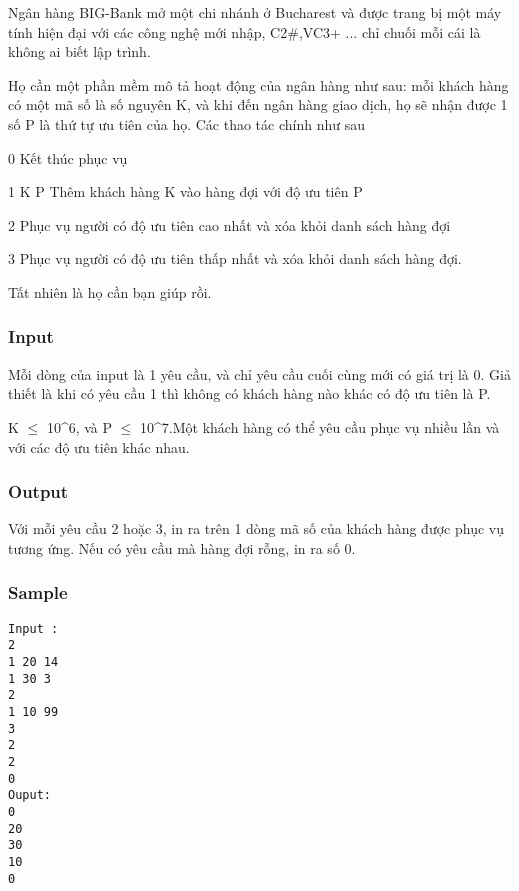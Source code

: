 



   Ngân hàng  BIG-Bank mở một chi nhánh ở Bucharest và được trang bị một máy tính hiện đại với các công nghệ mới nhập, C2\#,VC3+ ... chỉ chuối mỗi cái là không ai biết lập trình.  

   Họ cần một phần mềm mô tả hoạt động của ngân hàng như sau: mỗi khách hàng có một mã số là số nguyên K, và khi đến ngân hàng giao dịch, họ sẽ nhận được 1 số P là thứ tự ưu tiên của họ. Các thao tác chính như sau  

   0  Kết thúc phục vụ  

   1  K P Thêm khách hàng K vào hàng đợi với độ ưu tiên P  

   2  Phục vụ người có độ ưu tiên cao nhất và xóa khỏi danh sách hàng đợi  

   3  Phục vụ người có độ ưu tiên thấp nhất và xóa khỏi danh sách hàng đợi.  

   Tất nhiên là họ cần bạn giúp rồi.  



\subsubsection{   Input  }



   Mỗi dòng của input là 1 yêu cầu, và chỉ yêu cầu cuối cùng mới có giá trị là 0. Giả thiết là khi có yêu cầu 1 thì không có khách hàng nào khác có độ ưu tiên là P.  

   K $\le$ 10^6, và P $\le$  10^7.Một khách hàng có thể yêu cầu phục vụ nhiều lần và với các độ ưu tiên khác nhau.  



\subsubsection{   Output  }



   Với mỗi yêu cầu 2 hoặc 3, in ra trên 1 dòng mã số của khách hàng được phục vụ tương ứng. Nếu có yêu cầu mà hàng đợi rỗng, in ra số 0.  



\subsubsection{   Sample  }
\begin{verbatim}
Input :
2 
1 20 14 
1 30 3 
2 
1 10 99 
3 
2 
2 
0 
Ouput: 
0 
20 
30 
10 
0 
\end{verbatim}
